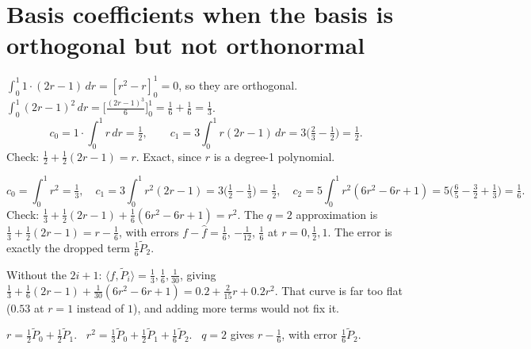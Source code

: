 \documentclass[11pt,letterpaper]{article}
\newcommand{\ans}[1]{\par\vspace{4pt}{\bfseries #1}\quad}
\begin{document}
\section{Basis coefficients when the basis is orthogonal but not orthonormal}

\ans{Q1}
$\int_0^1 1\cdot(2r - 1)\,dr = [r^2 - r]_0^1 = 0$, so they are orthogonal. $\int_0^1 (2r - 1)^2\,dr = \bigl[\tfrac{(2r - 1)^3}{6}\bigr]_0^1 = \tfrac16 + \tfrac16 = \tfrac13$.
\[
c_0 = 1\cdot\int_0^1 r\,dr = \tfrac12, \qquad c_1 = 3\int_0^1 r(2r - 1)\,dr = 3\bigl(\tfrac23 - \tfrac12\bigr) = \tfrac12.
\]
Check: $\tfrac12 + \tfrac12(2r - 1) = r$. Exact, since $r$ is a degree-1 polynomial.

\ans{Q2}
\[
c_0 = \int_0^1 r^2 = \tfrac13, \quad c_1 = 3\int_0^1 r^2(2r - 1) = 3\bigl(\tfrac12 - \tfrac13\bigr) = \tfrac12, \quad c_2 = 5\int_0^1 r^2(6r^2 - 6r + 1) = 5\bigl(\tfrac65 - \tfrac32 + \tfrac13\bigr) = \tfrac16.
\]
Check: $\tfrac13 + \tfrac12(2r - 1) + \tfrac16(6r^2 - 6r + 1) = r^2$. The $q = 2$ approximation is $\tfrac13 + \tfrac12(2r - 1) = r - \tfrac16$, with errors $f - \hat f = \tfrac16$, $-\tfrac1{12}$, $\tfrac16$ at $r = 0, \tfrac12, 1$. The error is exactly the dropped term $\tfrac16\tilde P_2$.

Without the $2i + 1$: $\langle f, \tilde P_i\rangle = \tfrac13, \tfrac16, \tfrac1{30}$, giving $\tfrac13 + \tfrac16(2r - 1) + \tfrac1{30}(6r^2 - 6r + 1) = 0.2 + \tfrac{2}{15}r + 0.2r^2$. That curve is far too flat ($0.53$ at $r = 1$ instead of $1$), and adding more terms would not fix it.
\begin{center}
\end{center}
\begin{result}
$r = \tfrac12\tilde P_0 + \tfrac12\tilde P_1$. \ $r^2 = \tfrac13\tilde P_0 + \tfrac12\tilde P_1 + \tfrac16\tilde P_2$. \ $q = 2$ gives $r - \tfrac16$, with error $\tfrac16\tilde P_2$.
\end{result}
\end{document}

